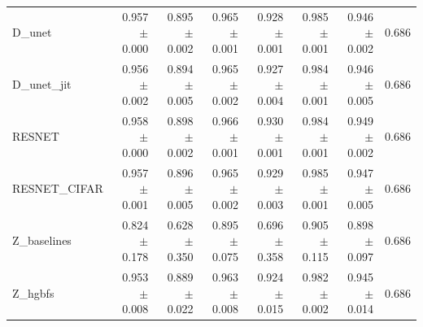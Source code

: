 \begin{table}[ht]
\begin{tabular}{lrrrrrrr}
D\_unet & 0.957 $\pm$ 0.000 & 0.895 $\pm$ 0.002 & 0.965 $\pm$ 0.001 & 0.928 $\pm$ 0.001 & 0.985 $\pm$ 0.001 & 0.946 $\pm$ 0.002 & 0.686 \\
D\_unet\_jit & 0.956 $\pm$ 0.002 & 0.894 $\pm$ 0.005 & 0.965 $\pm$ 0.002 & 0.927 $\pm$ 0.004 & 0.984 $\pm$ 0.001 & 0.946 $\pm$ 0.005 & 0.686 \\
RESNET & 0.958 $\pm$ 0.000 & 0.898 $\pm$ 0.002 & 0.966 $\pm$ 0.001 & 0.930 $\pm$ 0.001 & 0.984 $\pm$ 0.001 & 0.949 $\pm$ 0.002 & 0.686 \\
RESNET\_CIFAR & 0.957 $\pm$ 0.001 & 0.896 $\pm$ 0.005 & 0.965 $\pm$ 0.002 & 0.929 $\pm$ 0.003 & 0.985 $\pm$ 0.001 & 0.947 $\pm$ 0.005 & 0.686 \\
Z\_baselines & 0.824 $\pm$ 0.178 & 0.628 $\pm$ 0.350 & 0.895 $\pm$ 0.075 & 0.696 $\pm$ 0.358 & 0.905 $\pm$ 0.115 & 0.898 $\pm$ 0.097 & 0.686 \\
Z\_hgbfs & 0.953 $\pm$ 0.008 & 0.889 $\pm$ 0.022 & 0.963 $\pm$ 0.008 & 0.924 $\pm$ 0.015 & 0.982 $\pm$ 0.002 & 0.945 $\pm$ 0.014 & 0.686 \\
\hline
\end{tabular}
\end{table}

